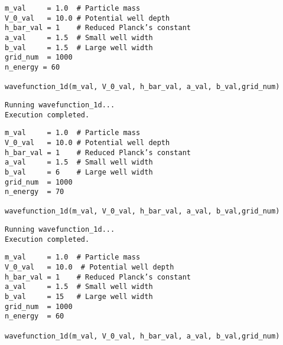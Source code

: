 \documentclass[11pt]{article}
\begin{document}
\begin{verbatim}
m_val     = 1.0  # Particle mass
V_0_val   = 10.0 # Potential well depth
h_bar_val = 1    # Reduced Planck’s constant
a_val     = 1.5  # Small well width
b_val     = 1.5  # Large well width
grid_num  = 1000
n_energy = 60

wavefunction_1d(m_val, V_0_val, h_bar_val, a_val, b_val,grid_num)
\end{verbatim}

\label{org9fa4c20}
\begin{verbatim}
Running wavefunction_1d...
Execution completed.
\end{verbatim}

\begin{center}

\end{center}
\begin{center}

\end{center}

\begin{verbatim}
m_val     = 1.0  # Particle mass
V_0_val   = 10.0 # Potential well depth
h_bar_val = 1    # Reduced Planck’s constant
a_val     = 1.5  # Small well width
b_val     = 6    # Large well width
grid_num  = 1000
n_energy  = 70

wavefunction_1d(m_val, V_0_val, h_bar_val, a_val, b_val,grid_num)
\end{verbatim}

\label{org979e308}
\begin{verbatim}
Running wavefunction_1d...
Execution completed.
\end{verbatim}

\begin{center}

\end{center}
\begin{center}

\end{center}

\begin{verbatim}
m_val     = 1.0  # Particle mass
V_0_val   = 10.0  # Potential well depth
h_bar_val = 1    # Reduced Planck’s constant
a_val     = 1.5  # Small well width
b_val     = 15   # Large well width
grid_num  = 1000
n_energy  = 60

wavefunction_1d(m_val, V_0_val, h_bar_val, a_val, b_val,grid_num)
\end{verbatim}
\end{document}
